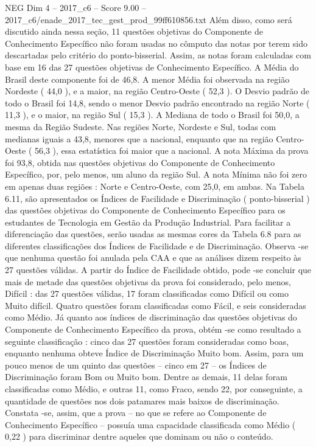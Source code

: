 \begin{textsample}{NEG Dim 4 – 2017\_c6 – Score 9.00 – 2017\_c6/enade\_2017\_tec\_gest\_prod\_99ff610856.txt}
Além disso, como será discutido ainda nessa seção, 11 questões objetivas do Componente de Conhecimento Específico não foram usadas no cômputo das notas por terem sido descartadas pelo critério do ponto-bisserial.
Assim, as notas foram calculadas com base em 16 das 27 questões objetivas de Conhecimento Específico.
A Média do Brasil deste componente foi de 46,8.
A menor Média foi observada na região Nordeste ( 44,0 ), e a maior, na região Centro-Oeste ( 52,3 ).
O Desvio padrão de todo o Brasil foi 14,8, sendo o menor Desvio padrão encontrado na região Norte ( 11,3 ), e o maior, na região Sul ( 15,3 ).
A Mediana de todo o Brasil foi 50,0, a mesma da Região Sudeste.
Nas regiões Norte, Nordeste e Sul, todas com medianas iguais a 43,8, menores que a nacional, enquanto que na região Centro-Oeste ( 56,3 ), essa estatística foi maior que a nacional.
A nota Máxima da prova foi 93,8, obtida nas questões objetivas do Componente de Conhecimento Específico, por, pelo menos, um aluno da região Sul.
A nota Mínima não foi zero em apenas duas regiões : Norte e Centro-Oeste, com 25,0, em ambas.
Na Tabela 6.11, são apresentados os Índices de Facilidade e Discriminação ( ponto-bisserial ) das questões objetivas do Componente de Conhecimento Específico para os estudantes de Tecnologia em Gestão da Produção Industrial.
Para facilitar a diferenciação das questões, serão usadas as mesmas cores da Tabela 6.8 para as diferentes classificações dos Índices de Facilidade e de Discriminação.
Observa -se que nenhuma questão foi anulada pela CAA e que as análises dizem respeito às 27 questões válidas.
A partir do Índice de Facilidade obtido, pode -se concluir que mais de metade das questões objetivas da prova foi considerado, pelo menos, Difícil : das 27 questões válidas, 17 foram classificadas como Difícil ou como Muito difícil.
Quatro questões foram classificadas como Fácil, e seis consideradas como Médio.
Já quanto aos índices de discriminação das questões objetivas do Componente de Conhecimento Específico da prova, obtém -se como resultado a seguinte classificação : cinco das 27 questões foram consideradas como boas, enquanto nenhuma obteve Índice de Discriminação Muito bom.
Assim, para um pouco menos de um quinto das questões – cinco em 27 – os Índices de Discriminação foram Bom ou Muito bom.
Dentre as demais, 11 delas foram classificadas como Médio, e outras 11, como Fraco, sendo 22, por conseguinte, a quantidade de questões nos dois patamares mais baixos de discriminação.
Constata -se, assim, que a prova – no que se refere ao Componente de Conhecimento Específico – possuía uma capacidade classificada como Médio ( 0,22 ) para discriminar dentre aqueles que dominam ou não o conteúdo.

\end{textsample}
